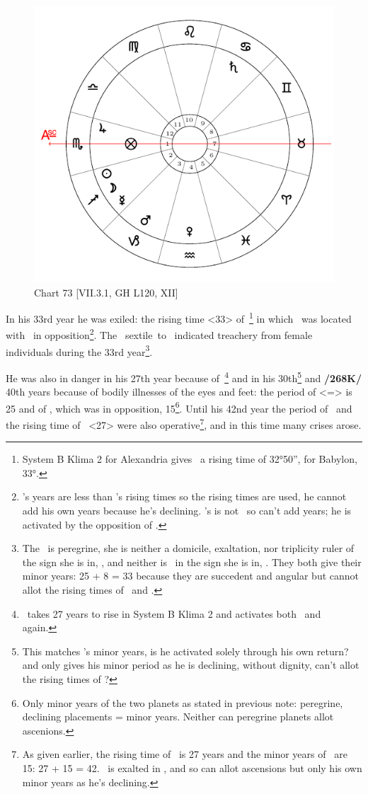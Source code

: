 \begin{figure}
\centering
\vspace{-20pt}
\includegraphics[width=.68\textwidth]{charts/7_3_1}
\caption{Chart 73 [VII.3.1, GH L120, XII]}
\label{fig:chart73}
\end{figure}

In his 33rd year he was exiled: the rising time <33> of \Cancer\,\footnote{System B Klima 2 for Alexandria gives \Cancer\, a rising time of 32°50'', for Babylon, 33°.} in which \Saturn\, was located with \Mars\, in opposition\footnote{\Saturn's years are less than \Cancer's rising times so the rising times are used, he cannot add his own years because he's declining. \Mars's is not \Cancer\, so can't add years; he is activated by the opposition of \Saturn.}. The \Moon\, sextile\, to \Venus\, indicated treachery from female individuals during the 33rd year\footnote{The \Moon\, is peregrine, she is neither a  domicile, exaltation, nor triplicity ruler of the sign she is in, \Sagittarius, and neither is \Venus\,  in the sign she is in, \Aquarius. They both give their minor years: 25 + 8 = 33 because they are succedent and angular but cannot allot the rising times of \Sagittarius\, and \Aquarius.}. 

He was also in danger in his 27th year because of \Capricorn\,\footnote{\Capricorn\, takes 27 years to rise in System B Klima 2 and activates both \Mars\, and \Saturn\, again.} and in his 30th\footnote{This matches \Saturn's minor years, is he activated solely through his own return? and only gives his minor period as he is declining, without dignity, can't allot the rising times of \Cancer?} and \textbf{/268K/} 40th years because of bodily illnesses of the eyes and feet: the period of \Cancer <=\Moon> is 25 and of \Mars, which was in opposition, 15\footnote{Only minor years of the two planets as stated in previous note: peregrine, declining placements = minor years. Neither can peregrine planets allot ascenions.}. Until his 42nd year the period of \Mars\, and the rising time of \Capricorn\, <27> were also operative\footnote{As given earlier, the rising time of \Capricorn\, is 27 years and the minor years of \Mars\, are 15: 27 + 15 = 42. \Mars\, is exalted in \Capricorn, and so can allot ascensions but only his own minor years as he's declining.}, and in this time many crises arose. 

